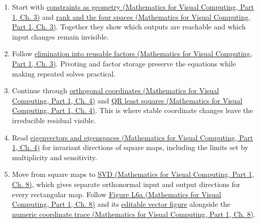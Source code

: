 \begin{enumerate}
\def\labelenumi{\arabic{enumi}.}
\tightlist
\item
  Start with \href{../02-Mathematics-for-Visual-Computing-P01/main.pdf\#01-foundations-i-ch019-a-system-is-an-intersection-of-constraints}{constraints as geometry (Mathematics for Visual Computing, Part 1, Ch. 3)} and \href{../02-Mathematics-for-Visual-Computing-P01/main.pdf\#01-foundations-i-ch019-rank-the-four-spaces-and-the-shape-of-the-answer}{rank and the four spaces (Mathematics for Visual Computing, Part 1, Ch. 3)}. Together they show which outputs are reachable and which input changes remain invisible.
\item
  Follow \href{../02-Mathematics-for-Visual-Computing-P01/main.pdf\#01-foundations-i-ch019-elimination-multipliers-become-stored-factor-data}{elimination into reusable factors (Mathematics for Visual Computing, Part 1, Ch. 3)}. Pivoting and factor storage preserve the equations while making repeated solves practical.
\item
  Continue through \href{../02-Mathematics-for-Visual-Computing-P01/main.pdf\#01-foundations-i-ch020-orthogonal-coordinates-preserve-the-shape-of-the-problem}{orthogonal coordinates (Mathematics for Visual Computing, Part 1, Ch. 4)} and \href{../02-Mathematics-for-Visual-Computing-P01/main.pdf\#01-foundations-i-ch020-qr-turns-least-squares-into-a-triangular-solve-plus-an-irreducible-residual}{QR least squares (Mathematics for Visual Computing, Part 1, Ch. 4)}. This is where stable coordinate changes leave the irreducible residual visible.
\item
  Read \href{../02-Mathematics-for-Visual-Computing-P01/main.pdf\#01-foundations-i-ch020-eigenvalues-eigenspaces-and-the-two-kinds-of-multiplicity}{eigenvectors and eigenspaces (Mathematics for Visual Computing, Part 1, Ch. 4)} for invariant directions of square maps, including the limits set by multiplicity and sensitivity.
\item
  Move from square maps to \href{../02-Mathematics-for-Visual-Computing-P01/main.pdf\#02-foundations-ii-ch024-the-svd-equation-as-independent-input-output-channels}{SVD (Mathematics for Visual Computing, Part 1, Ch. 8)}, which gives separate orthonormal input and output directions for every rectangular map. Follow \href{../02-Mathematics-for-Visual-Computing-P01/main.pdf\#02-foundations-ii-ch024-figure-l6a---watch-the-same-directions-become-an-ellipse}{Figure L6a (Mathematics for Visual Computing, Part 1, Ch. 8)} and its \href{../current/Assets/Print/3491f9bdb1d7f300619c0d11a33ded7f3b3adfdc803929f353124f6903c784b4.svg}{editable vector figure} alongside the \href{../02-Mathematics-for-Visual-Computing-P01/main.pdf\#02-foundations-ii-ch024-a-concrete-rotation-stretch-and-coordinate-trace}{numeric coordinate trace (Mathematics for Visual Computing, Part 1, Ch. 8)}.

\end{enumerate}
